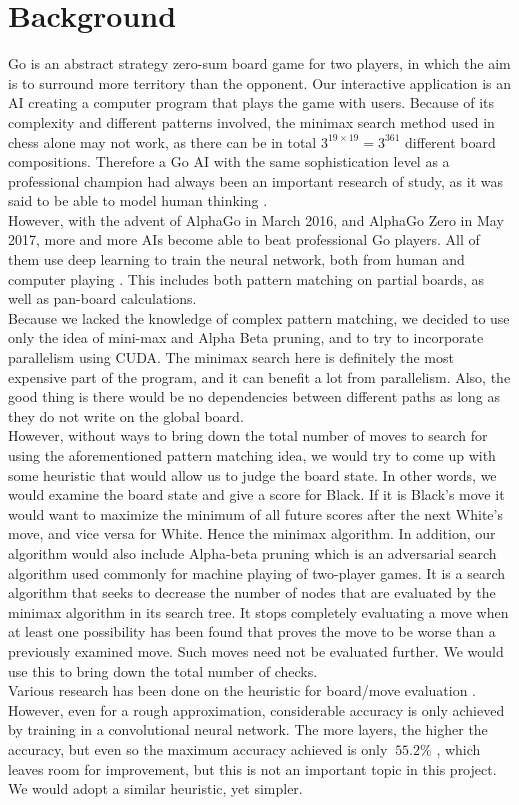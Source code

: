 \documentclass[11pt]{article}
\begin{document}
\section*{Background}
Go is an abstract strategy zero-sum board game for two players, in which the aim is to surround more territory than the opponent. Our interactive application is an AI creating a computer program that plays the game with users. Because of its complexity and different patterns involved, the minimax search method used in chess alone may not work, as there can be in total $3^{19 \times 19} = 3^{361}$ different board compositions. Therefore a Go AI with the same sophistication level as a professional champion had always been an important research of study, as it was said to be able to model human thinking \cite{SN}.
\\
However, with the advent of AlphaGo in March 2016, and AlphaGo Zero in May 2017, more and more AIs become able to beat professional Go players. All of them use deep learning to train the neural network, both from human and computer playing \cite{NA}. This includes both pattern matching on partial boards, as well as pan-board calculations.\\
Because we lacked the knowledge of complex pattern matching, we decided to use only the idea of mini-max and Alpha Beta pruning, and to try to incorporate parallelism using CUDA. The minimax search here is definitely the most expensive part of the program, and it can benefit a lot from parallelism. Also, the good thing is there would be no dependencies between different paths as long as they do not write on the global board.\\
However, without ways to bring down the total number of moves to search for using the aforementioned pattern matching idea, we would try to come up with some heuristic that would allow us to judge the board state. In other words, we would examine the board state and give a score for Black. If it is Black's move it would want to maximize the minimum of all future scores after the next White's move, and vice versa for White. Hence the minimax algorithm.
In addition, our algorithm would also include Alpha-beta pruning which is an adversarial search algorithm used commonly for machine playing of two-player games. It is a search algorithm that seeks to decrease the number of nodes that are evaluated by the minimax algorithm in its search tree. It stops completely evaluating a move when at least one possibility has been found that proves the move to be worse than a previously examined move. Such moves need not be evaluated further. We would use this to bring down the total number of checks. \\
Various research has been done on the heuristic for board/move evaluation \cite{ME}. However, even for a rough approximation, considerable accuracy is only achieved by training in a convolutional neural network. The more layers, the higher the accuracy, but even so the maximum accuracy achieved is only $ \ 55.2\%$ \cite{ME}, which leaves room for improvement, but this is not an important topic in this project. We would adopt a similar heuristic, yet simpler. \\
\end{document}
